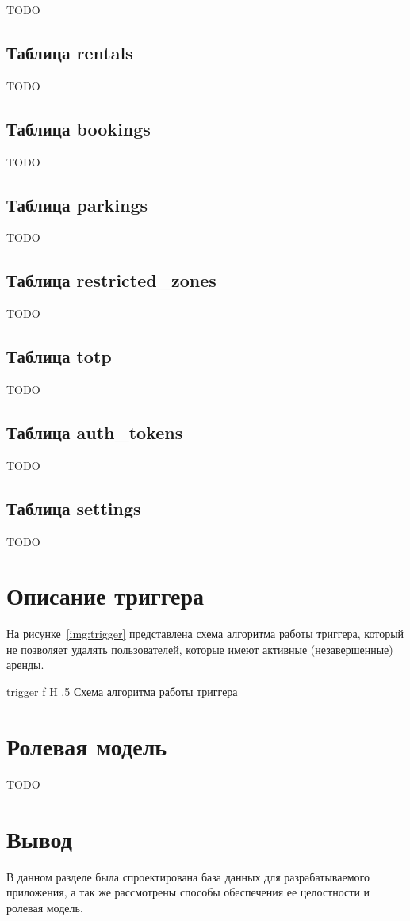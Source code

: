 TODO

\subsection{Таблица rentals}

TODO

\subsection{Таблица bookings}

TODO

\subsection{Таблица parkings}

TODO

\subsection{Таблица restricted\_zones}

TODO

\subsection{Таблица totp}

TODO

\subsection{Таблица auth\_tokens}

TODO

\subsection{Таблица settings}

TODO

\section{Описание триггера}

На рисунке~\ref{img:trigger} представлена схема алгоритма работы триггера, который не позволяет удалять пользователей, которые имеют активные (незавершенные) аренды.

    {trigger}
    {f}
    {H}
    {.5\textwidth}
    {Схема алгоритма работы триггера}

\section{Ролевая модель}

TODO

\section*{Вывод}

В данном разделе была спроектирована база данных для разрабатываемого приложения, а так же рассмотрены способы обеспечения ее целостности и ролевая модель.